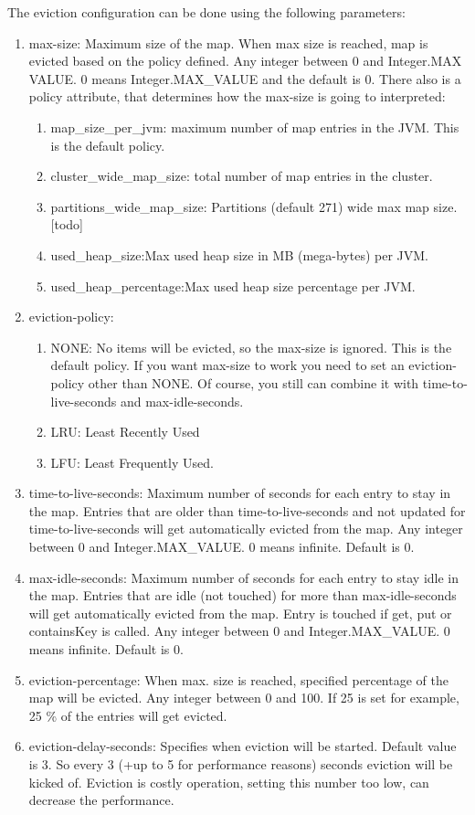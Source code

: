 The eviction configuration can be done using the following parameters:
\begin{enumerate}
\item max-size: Maximum size of the map. When max size is reached, map is evicted based on the policy defined. Any integer between 0 and Integer.MAX VALUE. 0 means Integer.MAX\_VALUE and the default is 0. There also is a policy attribute, that determines how the max-size is going to interpreted:
   \begin{enumerate}
   		\item map\_size\_per\_jvm: maximum number of map entries in the JVM. This is the default policy.
   		\item cluster\_wide\_map\_size: total number of map entries in the cluster. 
   		\item partitions\_wide\_map\_size: Partitions (default 271) wide max map size.[todo]
   		\item used\_heap\_size:Max used heap size in MB (mega-bytes) per JVM.
   		\item used\_heap\_percentage:Max used heap size percentage per JVM.
   \end{enumerate}	
\item eviction-policy:
   \begin{enumerate}
   	 	\item NONE: No items will be evicted, so the max-size is ignored. This is the default policy. If you want max-size to work you need to set an eviction-policy other than NONE. Of course, you still can combine it with time-to-live-seconds and  max-idle-seconds.
	 	\item LRU: Least Recently Used
	 	\item LFU: Least Frequently Used.
	\end{enumerate}
\item time-to-live-seconds: Maximum number of seconds for each entry to stay in the map. Entries that are older than time-to-live-seconds and not updated for time-to-live-seconds will get automatically evicted from the map. Any integer between 0 and Integer.MAX\_VALUE. 0 means infinite. Default is 0.
\item max-idle-seconds:  Maximum number of seconds for each entry to stay idle in the map. Entries that are idle (not touched) for more than max-idle-seconds will get automatically evicted from the map. Entry is touched if get, put or containsKey is called. Any integer between 0 and Integer.MAX\_VALUE. 0 means infinite. Default is 0.
\item eviction-percentage:  When max. size is reached, specified percentage of the map will be evicted. Any integer between 0 and 100. If 25 is set for example, 25 \% of the entries will get evicted.
\item eviction-delay-seconds: Specifies when eviction will be started. Default value is 3. So every 3 (+up to 5 for performance reasons) seconds eviction will be kicked of. Eviction is costly operation, setting this number too low, can decrease the performance.
\end{enumerate}

